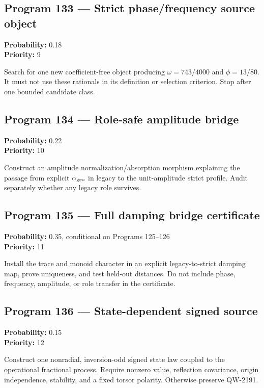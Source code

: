 \documentclass[11pt,a4paper,openany]{report}
\begin{document}
\subsection{Program 133 --- Strict phase/\allowbreak{}frequency source object}

\textbf{Probability:} 0.18\\
\textbf{Priority:} 9

Search for one new coefficient-free object producing \(\omega=743/4000\) and \(\phi=13/80\). It must not use these rationals in its definition or selection criterion. Stop after one bounded candidate class.

\subsection{Program 134 --- Role-safe amplitude bridge}

\textbf{Probability:} 0.22\\
\textbf{Priority:} 10

Construct an amplitude normalization/\allowbreak{}absorption morphism explaining the passage from explicit \(\alpha_{\rm geo}\) in legacy to the unit-amplitude strict profile. Audit separately whether any legacy role survives.

\subsection{Program 135 --- Full damping bridge certificate}

\textbf{Probability:} 0.35, conditional on Programs 125--126\\
\textbf{Priority:} 11

Install the trace and monoid character in an explicit legacy-to-strict damping map, prove uniqueness, and test held-out distances. Do not include phase, frequency, amplitude, or role transfer in the certificate.

\subsection{Program 136 --- State-dependent signed source}

\textbf{Probability:} 0.15\\
\textbf{Priority:} 12

Construct one nonradial, inversion-odd signed state law coupled to the operational fractional process. Require nonzero value, reflection covariance, origin independence, stability, and a fixed torsor polarity. Otherwise preserve QW-2191.
\end{document}

